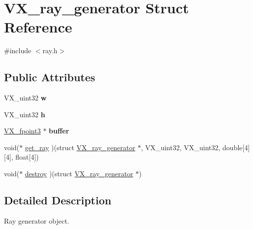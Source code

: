 \hypertarget{structVX__ray__generator}{\section{V\-X\-\_\-ray\-\_\-generator Struct Reference}
\label{structVX__ray__generator}
}


{\ttfamily \#include $<$ray.\-h$>$}

\subsection*{Public Attributes}
\begin{DoxyCompactItemize}
\item 
\hypertarget{structVX__ray__generator_a56aa3b292ae5cdae56693355a02b67f2}{V\-X\-\_\-uint32 {\bfseries w}}\label{structVX__ray__generator_a56aa3b292ae5cdae56693355a02b67f2}

\item 
\hypertarget{structVX__ray__generator_acf8a7def1e878bf8b76df8854908923e}{V\-X\-\_\-uint32 {\bfseries h}}\label{structVX__ray__generator_acf8a7def1e878bf8b76df8854908923e}

\item 
\hypertarget{structVX__ray__generator_a1fc8392e5f989ff4620f29fa89c31217}{\hyperlink{structVX__fpoint3}{V\-X\-\_\-fpoint3} $\ast$ {\bfseries buffer}}\label{structVX__ray__generator_a1fc8392e5f989ff4620f29fa89c31217}

\item 
void($\ast$ \hyperlink{structVX__ray__generator_a3f80cb2c5230366def4e80c00c722a40}{get\-\_\-ray} )(struct \hyperlink{structVX__ray__generator}{V\-X\-\_\-ray\-\_\-generator} $\ast$, V\-X\-\_\-uint32, V\-X\-\_\-uint32, double\mbox{[}4\mbox{]}\mbox{[}4\mbox{]}, float\mbox{[}4\mbox{]})
\item 
void($\ast$ \hyperlink{structVX__ray__generator_a191435961de0da7b56bb6153e61f9c26}{destroy} )(struct \hyperlink{structVX__ray__generator}{V\-X\-\_\-ray\-\_\-generator} $\ast$)
\end{DoxyCompactItemize}


\subsection{Detailed Description}
Ray generator object. 

